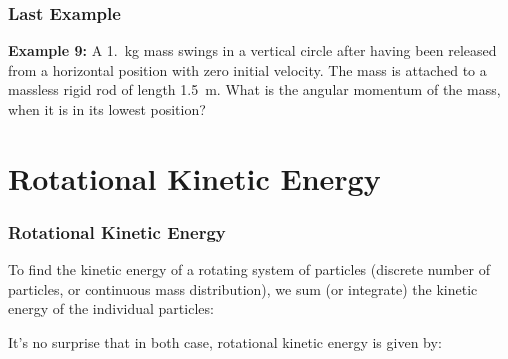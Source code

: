 \documentclass[12pt,compress,aspectratio=169]{beamer}
\newcommand{\eq}[2]{\vspace{#1}{\Large\begin{displaymath}#2\end{displaymath}}}
\begin{document}
\begin{frame}
  \frametitle{Last Example}
  \textbf{Example 9:} A \SI{1.}{\kg} mass swings in a vertical circle after
  having been released from a horizontal position with zero initial velocity.
  The mass is attached to a massless rigid rod of length \SI{1.5}{\metre}. What
  is the angular momentum of the mass, when it is in its lowest position?
\end{frame}


\section{Rotational Kinetic Energy}

\begin{frame}
  \frametitle{Rotational Kinetic Energy}
  To find the kinetic energy of a rotating system of particles (discrete number
  of particles, or continuous mass distribution), we sum (or integrate) the
  kinetic energy of the individual particles:
    
  
  \vspace{-.1in}It's no surprise that in both case, rotational kinetic energy
  is given by:
  
  \eq{-.2in}{
    \boxed{K=\frac{1}{2}I\omega^2}
  }
\end{frame}
\end{document}
